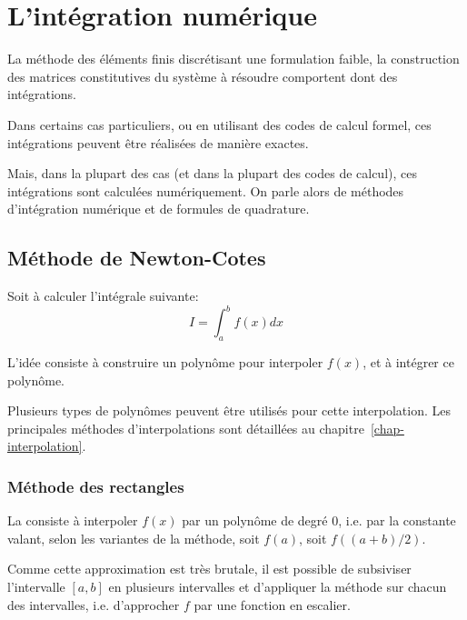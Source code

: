 \chapter{L'intégration numérique}\label{chap-quadrature}

La méthode des éléments finis discrétisant une formulation faible,  la construction des matrices 
constitutives du système à  résoudre comportent dont des intégrations.

Dans certains cas particuliers, ou en utilisant des codes de calcul formel, ces intégrations
peuvent être réalisées de manière exactes.

Mais, dans la plupart des cas (et dans la plupart des codes de calcul), ces
intégrations sont calculées numériquement. On parle alors de méthodes
d'intégration numérique et de formules de quadrature.






\medskip
\section{Méthode de Newton-Cotes}

Soit à calculer l'intégrale suivante:
\begin{equation}I=\int_a^b f(x)dx\end{equation}

\medskip
L'idée consiste à construire un polynôme pour interpoler $f(x)$, et
à intégrer ce polynôme.

\medskip
Plusieurs types de polynômes peuvent être utilisés pour cette interpolation.
Les principales méthodes d'interpolations sont détaillées au chapitre~\ref{chap-interpolation}.



\medskip
\subsection*{Méthode des rectangles}

La  consiste à interpoler $f(x)$ par un
polynôme de degré $0$, i.e. par la constante valant, selon les variantes de la
méthode, soit $f(a)$, soit $f((a+b)/2)$.

\medskip
Comme cette approximation est très brutale, il est possible de subsiviser
l'intervalle $[a,b]$ en plusieurs intervalles et d'appliquer la méthode sur chacun
des intervalles, i.e. d'approcher $f$ par une fonction en escalier.

